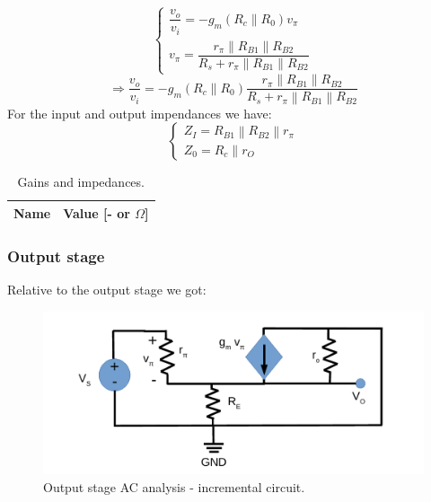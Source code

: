 \begin{equation}
    \begin{cases}
        \dfrac{v_{o}}{v_{i}}=-g_{m}\left( R_{c}\| R_{0}\right) v_{\pi } \\
        v_{\pi }=\dfrac{r_{\pi }\left\| R_{B1}\right\| R_{B2}}{R_{s}+r_{\pi }\left\| R_{B1}\right\| R_{B2}}
    \end{cases}
\end{equation}
\begin{equation}
    \Rightarrow \dfrac{v_{o}}{v_{i}}=-g_{m}\left( R_{c}\| R_{0}\right) \dfrac{r_{\pi }\left\| R_{B1}\right\| R_{B2}}{R_{s}+r_{\pi }\left\| R_{B1}\right\| R_{B2}}
\end{equation}
For the input and output impendances we have:
\begin{equation}
    \begin{cases}
        Z_{I}=R_{B1}\left\| R_{B2}\right\| r_{\pi } \\
        Z_{0}= R_{c}\| r_{O}
    \end{cases}
\end{equation}

\begin{table}[h]
    \centering
    \begin{tabular}{|l|r|}
      \hline
      {\bf Name} & {\bf Value [- or $\Omega$]} \\ \hline
      
    \end{tabular}
    \caption{Gains and impedances.}
    \label{tab:stage1_tab}
  \end{table}

\subsubsection{Output stage}
Relative to the output stage we got:


\begin{figure}[H]
    \begin{center}
     \includegraphics[width=15cm]{lab4_AC2.pdf}
    \caption{Output stage AC analysis - incremental circuit.}
    \label{fig:AC2 analysis}
    \end{center}
  \end{figure}


